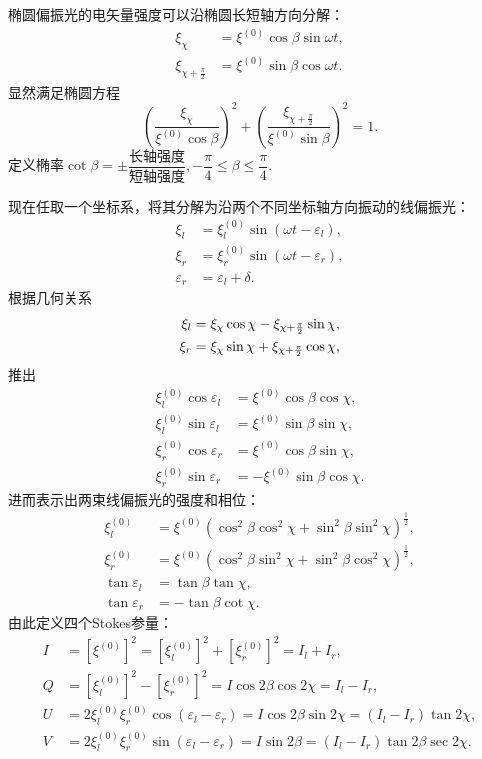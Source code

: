 \documentclass[../天体物理基础.tex]{subfiles}
\begin{document}
椭圆偏振光的电矢量强度可以沿椭圆长短轴方向分解：
\begin{align}
\xi_\chi&=\xi^{\left(0\right)}\cos\beta\sin\omega t,\\
\xi_{\chi+\frac{\pi}{2}}&=\xi^{\left(0\right)}\sin\beta\cos\omega t.
\end{align}
显然满足椭圆方程
\begin{equation}
(\frac{\xi_\chi}{\xi^{\left(0\right)}\cos\beta})^2+(\frac{\xi_{\chi+\frac\pi2}}{\xi^{\left(0\right)}\sin\beta})^2=1.
\end{equation}
定义椭率$\cot\beta=\pm\dfrac{\text{长轴强度}}{\text{短轴强度}},-\dfrac{\pi}{4}\le\beta\le\dfrac{\pi}{4}$.

现在任取一个坐标系，将其分解为沿两个不同坐标轴方向振动的线偏振光：
\begin{align}
\xi_l&=\xi_l^{(0)}\sin(\omega t-\varepsilon_l),\label{2.1.4}\\
\xi_r&=\xi_r^{(0)}\sin(\omega t-\varepsilon_r),\label{2.1.5}\\
\varepsilon_{r}&=\varepsilon_{l}+\delta.
\end{align}
根据几何关系
\begin{align}
\xi_l&=\xi_\chi\cos\chi-\xi_{\chi+\frac\pi2}\sin\chi,\notag\\
\xi_r&=\xi_\chi\sin\chi+\xi_{\chi+\frac\pi2}\cos\chi,\notag
\end{align}
推出
\begin{align}
\xi_l^{\left(0\right)}\cos\varepsilon_l&=\xi^{\left(0\right)}\cos\beta\cos\chi,\\
\xi_l^{\left(0\right)}\sin\varepsilon_l&=\xi^{\left(0\right)}\sin\beta\sin\chi,\\
\xi_r^{\left(0\right)}\cos\varepsilon_r&=\xi^{\left(0\right)}\cos\beta\sin\chi,\\
\xi_r^{\left(0\right)}\sin\varepsilon_r&=-\xi^{\left(0\right)}\sin\beta\cos\chi.
\end{align}
进而表示出两束线偏振光的强度和相位：
\begin{align}
\xi_l^{\left(0\right)}&=\xi^{\left(0\right)}\left(\cos^2\beta\cos^2\chi+\sin^2\beta\sin^2\chi\right)^\frac12,\\
\xi_r^{\left(0\right)}&=\xi^{\left(0\right)}\left(\cos^2\beta\sin^2\chi+\sin^2\beta\cos^2\chi\right)^\frac12,\\
\tan\varepsilon_l&=\tan\beta\tan\chi,\\
\tan\varepsilon_r&=-\tan\beta\cot\chi.
\end{align}
由此定义四个Stokes参量：
\begin{align}
I&=\left[\xi^{\left(0\right)}\right]^2=
\left[\xi_l^{\left(0\right)}\right]^2+\left[\xi_r^{\left(0\right)}\right]^2=I_l+I_r,\\
Q&=\left[\xi_l^{\left(0\right)}\right]^2-\left[\xi_r^{\left(0\right)}\right]^2=I\cos2\beta\cos2\chi=I_l-I_r,\\
U&=2\xi_l^{\left(0\right)}\xi_r^{\left(0\right)}\cos\left(\varepsilon_l-\varepsilon_r\right)=I\cos2\beta\sin2\chi=\left(I_l-I_r\right)\tan2\chi,\\
V&=2\xi_l^{\left(0\right)}\xi_r^{\left(0\right)}\sin\left(\varepsilon_l-\varepsilon_r\right)=I\sin2\beta=\left(I_l-I_r\right)\tan2\beta\sec2\chi.
\end{align}
\end{document}
